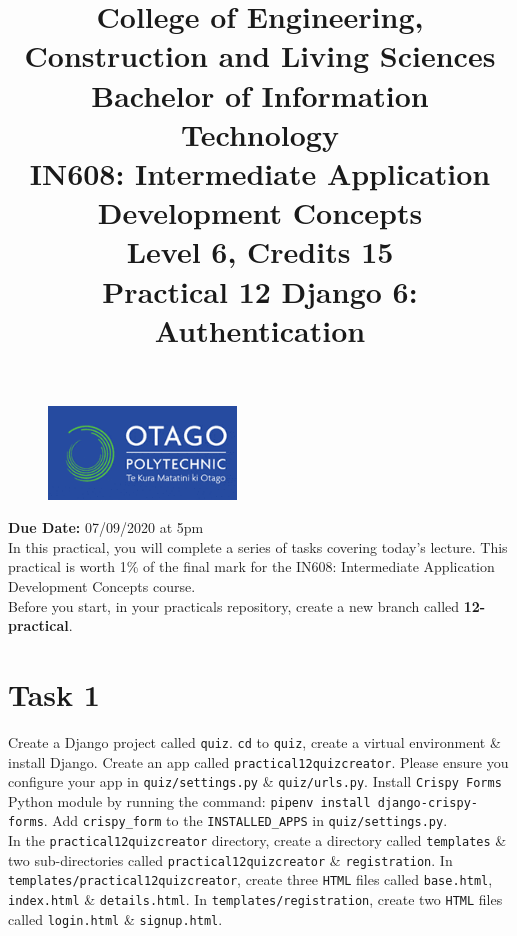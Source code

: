 \documentclass{article}
\author{}
\begin{document}
\begin{figure}
	\centering
	\includegraphics[width=50mm]{./img/logo.png}
\end{figure}

\title{College of Engineering, Construction and Living Sciences\\Bachelor of Information Technology\\IN608: Intermediate Application Development Concepts\\Level 6, Credits 15\\\textbf{Practical 12 Django 6: Authentication}} 
\date{}
\maketitle

\textbf{Due Date:} 07/09/2020 at 5pm \\

In this practical, you will complete a series of tasks covering today's lecture. This practical is worth 1\% of the final mark for the IN608: Intermediate Application Development Concepts course. \\

Before you start, in your practicals repository, create a new branch called \textbf{12-practical}.

\section*{Task 1} 
Create a Django project called \texttt{quiz}. \texttt{cd} to \texttt{quiz}, create a virtual environment \& install Django. Create an app called \texttt{practical12quizcreator}. Please ensure you configure your app in \texttt{quiz/settings.py} \& \texttt{quiz/urls.py}. Install \texttt{Crispy Forms} Python module by running the command: \texttt{pipenv install django-crispy-forms}. Add \texttt{crispy\_form} to the \texttt{INSTALLED\_APPS} in \texttt{quiz/settings.py}. \\

In the \texttt{practical12quizcreator} directory, create a directory called \texttt{templates} \& two sub-directories called \texttt{practical12quizcreator} \& \texttt{registration}. In \texttt{templates/practical12quizcreator}, create three \texttt{HTML} files called \texttt{base.html}, \texttt{index.html} \& \texttt{details.html}. In \texttt{templates/registration}, create two \texttt{HTML} files called \texttt{login.html} \& \texttt{signup.html}. \\
\end{document}
